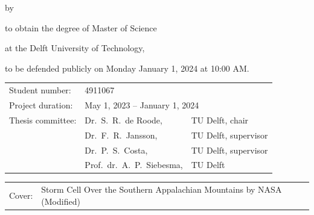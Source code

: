 \begin{titlepage}

\begin{center}

{\makeatletter
\largetitlestyle\fontsize{45}{45}\selectfont\@title
\makeatother}

{\makeatletter
\ifdefvoid{\@subtitle}{}{\bigskip\titlestyle\fontsize{20}{20}\selectfont\@subtitle}
\makeatother}

\bigskip
\bigskip

by

\bigskip
\bigskip

{\makeatletter
\largetitlestyle\fontsize{25}{25}\selectfont\@author
\makeatother}

\bigskip
\bigskip

to obtain the degree of Master of Science

at the Delft University of Technology,

to be defended publicly on Monday January 1, 2024 at 10:00 AM.

\vfill

\begin{tabular}{lll}
    Student number: & 4911067 \\
    Project duration: & \multicolumn{2}{l}{May 1, 2023 -- January 1, 2024} \\
    Thesis committee: & Dr.\ S.\ R.\ de Roode, & TU Delft, chair \\
                      & Dr.\ F.\ R.\ Jansson, & TU Delft, supervisor \\
                      & Dr.\ P.\ S.\ Costa, & TU Delft, supervisor \\
                      & Prof.\ dr.\ A.\ P.\ Siebesma, & TU Delft
\end{tabular}

\bigskip
\bigskip

\bigskip
\bigskip
\begin{tabular}{p{15mm}p{10cm}}
    Cover: & Storm Cell Over the Southern Appalachian Mountains by NASA (Modified)\\
\end{tabular}


\end{center}
\end{titlepage}
